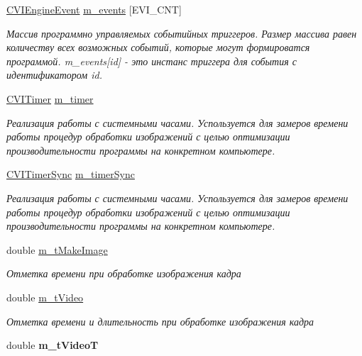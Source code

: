 \begin{DoxyCompactItemize}
\hyperlink{class_c_v_i_engine_event}{C\+V\+I\+Engine\+Event} \hyperlink{class_c_v_i_engine_base_a88f59347ca703a36ea9965b96b3ab552}{m\+\_\+events} \mbox{[}E\+V\+I\+\_\+\+C\+N\+T\mbox{]}
\begin{DoxyCompactList}\small\item\em Массив программно управляемых событийных триггеров. Размер массива равен количеству всех возможных событий, которые могут формироватся программой. m\+\_\+events\mbox{[}id\mbox{]} -\/ это инстанс триггера для события с идентификатором id. \end{DoxyCompactList}\item 
\hyperlink{class_c_v_i_timer}{C\+V\+I\+Timer} \hyperlink{class_c_v_i_engine_base_a928c4511d2e46b9cd4b7c9b3b7322855}{m\+\_\+timer}
\begin{DoxyCompactList}\small\item\em Реализация работы с системными часами. Успользуется для замеров времени работы процедур обработки изображений с целью оптимизации производительности программы на конкретном компьютере. \end{DoxyCompactList}\item 
\hyperlink{class_c_v_i_timer_sync}{C\+V\+I\+Timer\+Sync} \hyperlink{class_c_v_i_engine_base_a8709ba629c654585cc38d13ccf3a23b8}{m\+\_\+timer\+Sync}
\begin{DoxyCompactList}\small\item\em Реализация работы с системными часами. Успользуется для замеров времени работы процедур обработки изображений с целью оптимизации производительности программы на конкретном компьютере. \end{DoxyCompactList}\item 
double \hyperlink{class_c_v_i_engine_base_a0e3c27e7d2ed527eca5445a669080838}{m\+\_\+t\+Make\+Image}
\begin{DoxyCompactList}\small\item\em Отметка времени при обработке изображения кадра \end{DoxyCompactList}\item 
double \hyperlink{class_c_v_i_engine_base_a0d6409bd350e84190cd6904732c4fe83}{m\+\_\+t\+Video}
\begin{DoxyCompactList}\small\item\em Отметка времени и длительность при обработке изображения кадра \end{DoxyCompactList}\item 
\hypertarget{class_c_v_i_engine_base_a98df2a6b3724ab56deee0ed61e3773f8}{double {\bfseries m\+\_\+t\+Video\+T}}\label{class_c_v_i_engine_base_a98df2a6b3724ab56deee0ed61e3773f8}


\end{DoxyCompactItemize}
